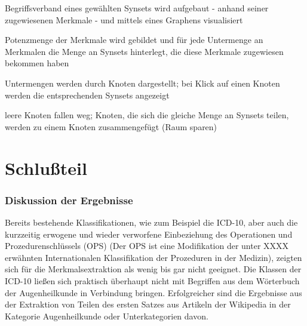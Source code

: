 \documentclass[pagesize,DIV=calc,12pt,draft]{scrreprt}
\begin{document}
\begin{inparaenum}
\item Begriffsverband eines gewählten Synsets wird aufgebaut - anhand seiner zugewiesenen Merkmale - und mittels eines Graphens visualisiert

\item Potenzmenge der Merkmale wird gebildet und für jede Untermenge an Merkmalen die Menge an Synsets hinterlegt, die diese Merkmale zugewiesen bekommen haben

\item Untermengen werden durch Knoten dargestellt; bei Klick auf einen Knoten werden die entsprechenden Synsets angezeigt

\item leere Knoten fallen weg; Knoten, die sich die gleiche Menge an Synsets teilen, werden zu einem Knoten zusammengefügt (Raum sparen)
\end{inparaenum}

\chapter{Schlußteil}

\subsection{Diskussion der Ergebnisse}

Bereits bestehende Klassifikationen, wie zum Beispiel die ICD-10, aber auch die kurzzeitig erwogene und wieder verworfene Einbeziehung des Operationen und Prozedurenschlüssels (OPS) (Der OPS ist eine Modifikation der unter XXXX erwähnten Internationalen Klassifikation der Prozeduren in der Medizin), zeigten sich für die Merkmalsextraktion als wenig bis gar nicht geeignet. 
Die Klassen der ICD-10 ließen sich praktisch überhaupt nicht mit Begriffen aus dem Wörterbuch der Augenheilkunde in Verbindung bringen. 
Erfolgreicher sind die Ergebnisse aus der Extraktion von Teilen des ersten Satzes aus Artikeln der Wikipedia in der Kategorie Augenheilkunde oder Unterkategorien davon. 
\end{document}
